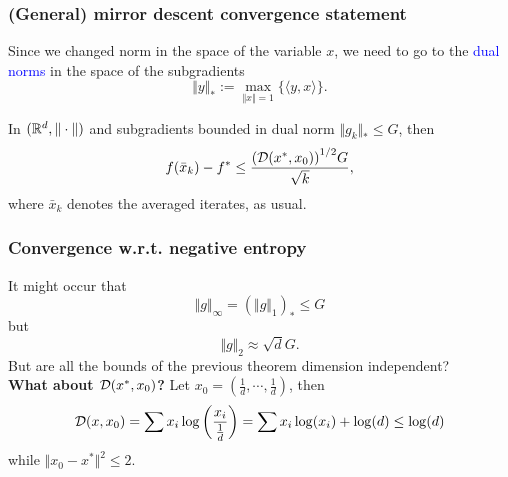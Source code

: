 \documentclass{beamer}
\begin{document}



\begin{frame}
  \frametitle{(General) mirror descent convergence statement}
  Since we changed norm in the space of the variable $x$, we need to go to the \textcolor{blue}{dual norms} in the space of the subgradients
  \begin{equation}
    \Vert y \Vert_* := \max_{\Vert x \Vert=1} \{ \langle y, x \rangle\}.
  \end{equation}
  \begin{theorem}
    In $(\mathbb{R}^d, \Vert \cdot \Vert)$ and subgradients bounded in dual norm $\Vert g_k \Vert_* \le G$, then
    \begin{equation}
      f(\bar{x}_k) - f^* \le \frac{{(\mathcal{D}(x^*, x_0))}^{1/2} G}{\sqrt{k}},
    \end{equation}
    where $\bar{x}_k$ denotes the averaged iterates, as usual.
  \end{theorem}
\end{frame}


\begin{frame}
  \frametitle{Convergence w.r.t. negative entropy}
    It might occur that
    \begin{equation}
      \Vert g \Vert_\infty = (\Vert g \Vert_1)_* \le G
    \end{equation}
    but
    \begin{equation}
      \Vert g \Vert_2 \approx \sqrt{d} G.
    \end{equation}
    But are all the bounds of the previous theorem dimension independent?\\
    \textbf{What about $\mathcal{D}(x^*, x_0) $?}
    Let $x_0 = (\frac{1}{d}, \cdots , \frac{1}{d})$, then
    \begin{equation}
      \mathcal{D}(x, x_0) = \sum x_i \log\left(\frac{x_i}{\frac1d}\right) = \sum x_i \log(x_i) + \log(d) \le \log(d)
    \end{equation}
    while $ \Vert x_0 - x^* \Vert^2 \le 2$.

\end{frame}
\end{document}
